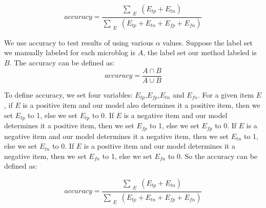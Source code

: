 \begin{equation}
\label{eq:def-presision}
accuracy = \frac{\sum_{\substack{E}} (E_{tp} + E_{tn} )}{ \sum_{\substack{E}} (E_{tp} + E_{tn} + E_{fp} + E_{fn}) }
\end{equation} 




We use accuracy to test results of using various $\alpha$ values. Suppose the label set we manually labeled for each microblog is $A$, the label set our method labeled is $B$.
The accuracy can be defined as:
\begin{equation}
\label{eq:def-accuracy}
accuracy = \frac{ A \cap B }{ A \cup B }
\end{equation}
  

To define accuracy, we set four variables: $E_{tp}$,$E_{fp}$,$E_{tn}$ and $E_{fn}$. For a given item $E$, if $E$ is a positive item and our model also determines it a positive item, then we set $E_{tp}$ to 1, else we set $E_{tp}$ to 0. If $E$ is a negative item and our model determines it a positive item, then we set $E_{fp}$ to 1, else we set $E_{fp}$ to 0. If $E$ is a negative item and our model determines it a negative item, then we set $E_{tn}$ to 1, else we set $E_{tn}$ to 0. If $E$ is a positive item and our model determines it a negative item, then we set $E_{fn}$ to 1, else we set $E_{fn}$ to 0. So the accuracy can be defined as:

\begin{equation}
\label{eq:def-presision}
accuracy = \frac{\sum_{\substack{E}} (E_{tp} + E_{tn} )}{ \sum_{\substack{E}} (E_{tp} + E_{tn} + E_{fp} + E_{fn}) }
\end{equation}













